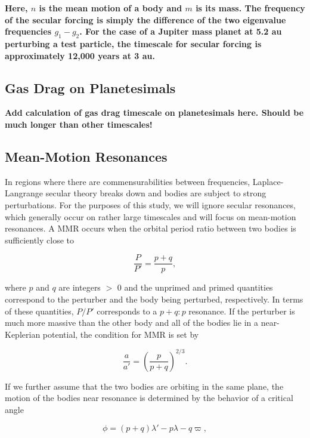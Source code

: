 \documentclass[fleqn,usenatbib]{mnras}
\begin{document}
\noindent \textbf{Here, $n$ is the mean motion of a body and $m$ is its mass. The frequency of the secular forcing is simply the difference of the two eigenvalue frequencies $g_{1} - g_{2}$. For the case of a Jupiter mass planet at 5.2 au perturbing a test particle, the timescale for secular forcing is approximately 12,000 years at 3 au.}

\subsection{Gas Drag on Planetesimals}

\textbf{Add calculation of gas drag timescale on planetesimals here. Should be much longer than other timescales!}

\subsection{Mean-Motion Resonances}

In regions where there are commensurabilities between frequencies, Laplace-Langrange secular theory breaks down and bodies are subject to strong 
perturbations. For the purposes of this study, we will ignore secular resonances, which generally occur on rather large timescales and will focus on 
mean-motion resonances. A MMR occurs  when the orbital period ratio between two bodies is sufficiently close to

\begin{equation}\label{eq:per_mmr}
	\frac{P}{P'} = \frac{p + q}{p},
\end{equation}

\noindent where  $p$ and $q$ are integers $>$ 0 and the unprimed and primed quantities correspond to the perturber and the body being perturbed, 
respectively. In terms of these quantities, $P/P'$ corresponds to a $p+q:p$ resonance. If the perturber is much more massive than the other body and all of the 
bodies lie in a near-Keplerian potential, the condition for MMR is set by

\begin{equation}\label{eq:a_mmr}
	\frac{a}{a'} = \left( \frac{p}{p + q} \right)^{2/3}.
\end{equation}

If we further assume that the two bodies are orbiting in the same plane, the motion of the bodies near resonance is determined by the
behavior of a critical angle

\begin{equation}\label{eq:phi_crit}
	\phi = (p + q) \lambda' - p \lambda - q \varpi,
\end{equation}
\end{document}

